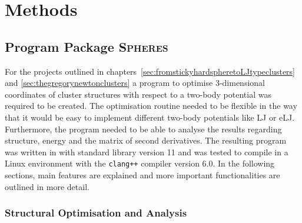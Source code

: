 
\acresetall

\part{Methods}
\label{sec:methods}

\chapter{Program Package \textsc{Spheres}}
\label{sec:theprogramspheres}

For the projects outlined in
chapters~\ref{sec:fromstickyhardspheretoLJtypeclusters} and
\ref{sec:thegregorynewtonclusters} a program to optimise 3-dimensional
coordinates of cluster structures with respect to a two-body potential was
required to be created. The optimisation routine needed to be flexible in the
way that it would be easy to implement different two-body potentials like
\acf{LJ} or \acf{eLJ}. Furthermore, the program needed to be able to analyse the
results regarding structure, energy and the matrix of second derivatives. The
resulting program was written in \Cpp with standard library version 11 and was
tested to compile in a Linux environment with the \texttt{clang++} compiler
version 6.0. In the following sections, main features are explained and more
important functionalities are outlined in more detail.


\section{Structural Optimisation and Analysis}
\label{sec:generalstructure}

